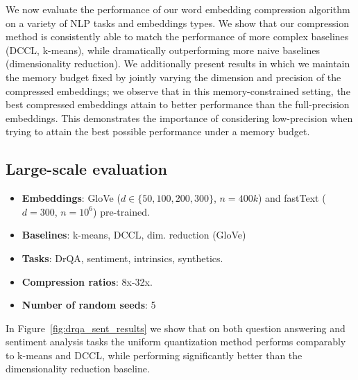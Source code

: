 We now evaluate the performance of our word embedding compression algorithm on a variety of NLP tasks and embeddings types.
We show that our compression method is consistently able to match the performance of more complex baselines (DCCL, k-means), while dramatically outperforming more naive baselines (dimensionality reduction).
We additionally present results in which we maintain the memory budget fixed by  jointly varying the dimension and precision of the compressed embeddings;
we observe that in this memory-constrained setting, the best compressed embeddings attain  to  better performance than the full-precision embeddings.
This demonstrates the importance of considering low-precision when trying to attain the best possible performance under a memory budget.

\subsection{Large-scale evaluation}
\begin{itemize}
	\item \textbf{Embeddings}: GloVe ($d\in\{50,100,200,300\}$, $n=400k$) and fastText ($d=300$, $n=10^6$) pre-trained.
	\item \textbf{Baselines}: k-means, DCCL, dim. reduction (GloVe)
	\item \textbf{Tasks}: DrQA, sentiment, intrinsics, synthetics.
	\item \textbf{Compression ratios}: 8x-32x.
	\item \textbf{Number of random seeds}: 5
\end{itemize}

In Figure~\ref{fig:drqa_sent_results} we show that on both question answering and sentiment analysis tasks the uniform quantization method performs comparably to k-means and DCCL, while performing significantly better than the dimensionality reduction baseline.



